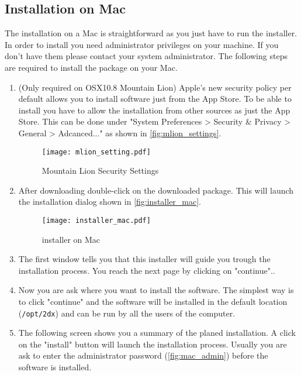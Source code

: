 \subsection{Installation on Mac}
\label{sec:install_pkg}
The installation on a Mac is straightforward as you just have to run the installer. In order to install you need administrator privileges on your machine. If you don't have them please contact your system administrator. The following steps are required to install the package on your Mac.

\begin{enumerate}
	\item (Only required on OSX10.8 Mountain Lion) Apple's new security policy per default allows you to install software just from the App Store. To be able to install {\twodx} you have to allow the installation from other sources as just the App Store. This can be done under "System Preferences > Security \& Privacy > General > Adcanced..." as shown in \autoref{fig:mlion_settings}.
	
	\begin{figure}[H]
		\centering
		\texttt{[image: mlion\_setting.pdf]}
		\caption{Mountain Lion Security Settings}
		\label{fig:mlion_settings}
	\end{figure}
	
	\item After downloading double-click on the downloaded package. This will launch the installation dialog shown in \autoref{fig:installer_mac}.
	
	\begin{figure}[H]
		\centering
		\texttt{[image: installer\_mac.pdf]}
		\caption{{\twodx} installer on Mac}
		\label{fig:installer_mac}
	\end{figure}
	
	\item The first window tells you that this installer will guide you trough the installation process. You reach the next page by clicking on "continue"..
	\item Now you are ask where you want to install the software. The simplest way is to click "continue" and the software will be installed in the default location (\texttt{/opt/2dx}) and can be run by all the users of the computer.
	\item The following screen shows you a summary of the planed installation. A click on the "install" button will launch the installation process. Usually you are ask to enter the administrator password (\autoref{fig:mac_admin}) before the software is installed.
	

\end{enumerate}

